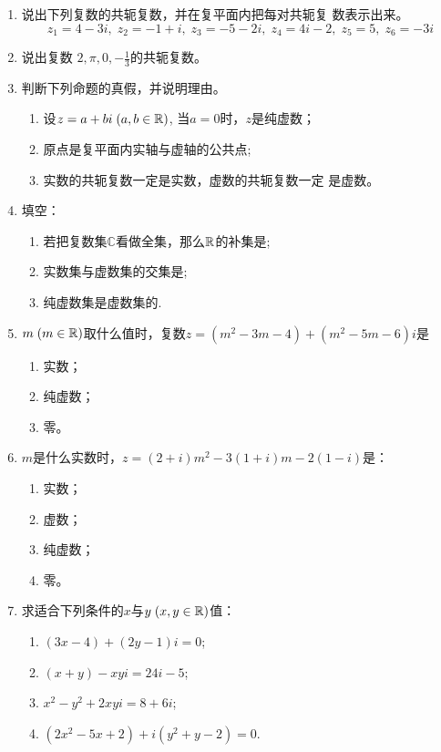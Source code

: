 \begin{enumerate}
\item 说出下列复数的共轭复数，并在复平面内把每对共轭复
数表示出来。
$$z_{1}=4-3i,\; z_{2}=-1+i,\; z_{3}=-5-2i,\; z_{4}=4i-2,\; z_{5}=5,\; z_{6}=-3i$$
\item 说出复数 $2,\pi,0,-\frac13$的共轭复数。
\item 判断下列命题的真假，并说明理由。
\begin{enumerate}[(1)]
\item 设$z=a+bi\; (a,b\in \mathbb{R})$, 当$a=0$时，$z$是纯虚数；
\item 原点是复平面内实轴与虚轴的公共点;
\item 实数的共轭复数一定是实数，虚数的共轭复数一定
是虚数。
\end{enumerate}
\item 填空：
\begin{enumerate}[(1)]
\item 若把复数集$\mathbb{C}$看做全集，那么$\mathbb{R}$的补集是\blank\blank ; 
\item 实数集与虚数集的交集是\blank\blank ;
\item 纯虚数集是虚数集的\blank\blank .
\end{enumerate}

\item $m\; (m\in\mathbb{R})$取什么值时，复数$z=(m^2-3m-4)+(m^2-5m-6)i$是
\begin{multicols}{3}
\begin{enumerate}[(1)]
\item 实数；    \item 纯虚数；    \item 零。
\end{enumerate}

\end{multicols}

\item $m$是什么实数时，$z=(2+i)m^2-3(1+i)m-2(1-i)$是：
\begin{multicols}{4}
    \begin{enumerate}[(1)]
    \item 实数；  \item 虚数；  \item 纯虚数；    \item 零。
    \end{enumerate}
    
    \end{multicols}

\item 求适合下列条件的$x$与$y\; (x,y\in\mathbb{R})$值：
\begin{multicols}{2}
 \begin{enumerate}[(1)]
\item $(3x-4)+(2y-1)i=0$;
\item $(x+y)-xyi=24i-5$;
\item $x^2-y^2+2xyi=8+6i$;
\item $(2x^2-5x+2)+i(y^2+y-2)=0$.
\end{enumerate}   
\end{multicols}
\end{enumerate}

